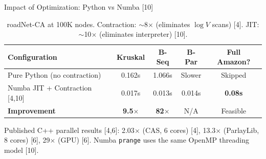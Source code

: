 \documentclass[aspectratio=169, 11pt]{beamer}
\begin{document}
\begin{frame}{Impact of Optimization: Python vs Numba [10]}

\renewcommand{\arraystretch}{1.3}
\begin{table}\centering
\begin{tabular}{lcccc}
\toprule
\textbf{Configuration} & \textbf{Kruskal} & \textbf{B-Seq} & \textbf{B-Par} & \textbf{Full Amazon?} \\
\midrule
Pure Python (no contraction) & 0.162s & 1.066s & Slower & Skipped \\
Numba JIT + Contraction [4,10] & 0.017s & 0.013s & 0.014s & \textbf{0.08s} \\
\midrule
\textbf{Improvement} & \textbf{9.5$\times$} & \textbf{82$\times$} & N/A & Feasible \\
\bottomrule
\end{tabular}
\caption*{roadNet-CA at 100K nodes. Contraction: $\sim$8$\times$ (eliminates $\log V$ scans) [4]. JIT: $\sim$10$\times$ (eliminates interpreter) [10].}
\end{table}

\vspace{0.3em}

Published C++ parallel results [4,6]: 2.03$\times$ (CAS, 6 cores) [4], 13.3$\times$ (ParlayLib, 8 cores) [6], 29$\times$ (GPU) [6]. Numba \texttt{prange} uses the same OpenMP threading model [10].

\end{frame}
\end{document}
